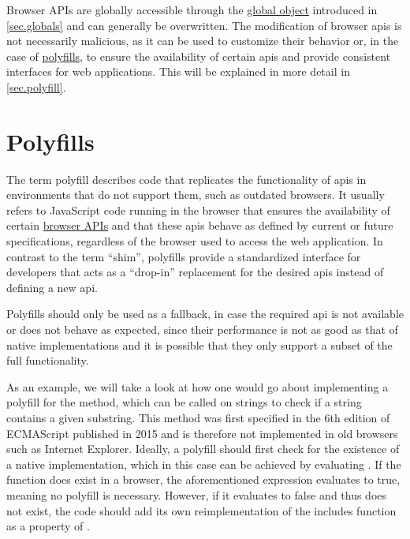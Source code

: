 Browser APIs are globally accessible through the \hyperref[sec.globals]{global object} introduced in \autoref{sec.globals} and can generally be overwritten. The modification of browser \acsp{api} is not necessarily malicious, as it can be used to customize their behavior or, in the case of \hyperref[sec.polyfill]{polyfills}, to ensure the availability of certain \acsp{api} and provide consistent interfaces for web applications. This will be explained in more detail in \autoref{sec.polyfill}.



\section{Polyfills}
\label{sec.polyfill}

The term polyfill describes code that replicates the functionality of \acp{api} in environments that do not support them, such as outdated browsers. It usually refers to JavaScript code running in the browser that ensures the availability of certain \hyperref[sec.browserAPIs]{browser APIs} and that these \acsp{api} behave as defined by current or future specifications, regardless of the browser used to access the web application. In contrast to the term “shim”, polyfills provide a standardized interface for developers that acts as a “drop-in” replacement for the desired \acsp{api} instead of defining a new \acs{api}. \cite{MozPolyfill, RemyPolyfill}

Polyfills should only be used as a fallback, in case the required \acs{api} is not available or does not behave as expected, since their performance is not as good as that of native implementations and it is possible that they only support a subset of the full functionality. \cite{MozPolyfill}

As an example, we will take a look at how one would go about implementing a polyfill for the  method, which can be called on strings to check if a string contains a given substring. This method was first specified in the 6th edition of ECMAScript published in 2015 \cite{ECMA262_edition6} and is therefore not implemented in old browsers such as Internet Explorer. Ideally, a polyfill should first check for the existence of a native implementation, which in this case can be achieved by evaluating . If the function does exist in a browser, the aforementioned expression evaluates to true, meaning no polyfill is necessary. However, if it evaluates to false and thus does not exist, the code should add its own reimplementation of the includes function as a property of .

